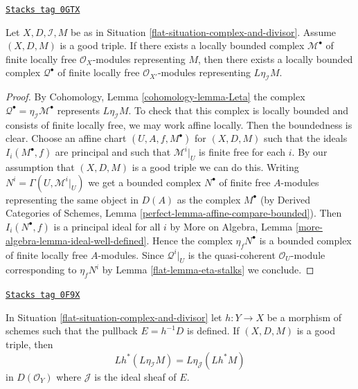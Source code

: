 \begin{lemma}
\label{flat-lemma-good-triple-bdd-loc-free}
\href{https://stacks.math.columbia.edu/tag/0GTX}{\texttt{Stacks tag 0GTX}}

Let $X, D, \mathcal{I}, M$ be as in
Situation \ref{flat-situation-complex-and-divisor}.
Assume $(X, D, M)$ is a good triple.
If there exists a locally bounded complex $\mathcal{M}^\bullet$
of finite locally free $\mathcal{O}_X$-modules representing $M$,
then there exists a locally bounded complex $\mathcal{Q}^\bullet$
of finite locally free $\mathcal{O}_{X'}$-modules representing
$L\eta_\mathcal{I}M$.
\end{lemma}

\begin{proof}

By Cohomology, Lemma \ref{cohomology-lemma-Leta}
the complex $\mathcal{Q}^\bullet = \eta_\mathcal{I}\mathcal{M}^\bullet$
represents $L\eta_\mathcal{I}M$. To check that this complex
is locally bounded and consists of finite locally free, we may work
affine locally. Then the boundedness is clear.
Choose an affine chart $(U, A, f, M^\bullet)$ for $(X, D, M)$
such that the ideals $I_i(M^\bullet, f)$ are principal and such that
$\mathcal{M}^i|_U$ is finite free for each $i$. By our assumption
that $(X, D, M)$ is a good triple we can do this. Writing
$N^i = \Gamma(U, \mathcal{M}^i|_U)$ we get a bounded
complex $N^\bullet$ of finite free $A$-modules representing the
same object in $D(A)$ as the complex $M^\bullet$ (by
Derived Categories of Schemes, Lemma
\ref{perfect-lemma-affine-compare-bounded}).
Then $I_i(N^\bullet, f)$ is a principal ideal for all $i$
by More on Algebra, Lemma \ref{more-algebra-lemma-ideal-well-defined}.
Hence the complex $\eta_fN^\bullet$ is a bounded complex
of finite locally free $A$-modules. Since
$\mathcal{Q}^i|_U$ is the quasi-coherent $\mathcal{O}_U$-module
corresponding to $\eta_fN^i$ by Lemma \ref{flat-lemma-eta-stalks} we conclude.
\end{proof}

\begin{lemma}
\label{flat-lemma-complex-and-divisor-eta-pull}
\href{https://stacks.math.columbia.edu/tag/0F9X}{\texttt{Stacks tag 0F9X}}

In Situation \ref{flat-situation-complex-and-divisor} let $h : Y \to X$
be a morphism of schemes such that the pullback $E = h^{-1}D$
is defined. If $(X, D, M)$ is a good triple, then
$$
Lh^*(L\eta_\mathcal{I}M) = L\eta_\mathcal{J}(Lh^*M)
$$
in $D(\mathcal{O}_Y)$ where $\mathcal{J}$ is the ideal sheaf of $E$.
\end{lemma}

